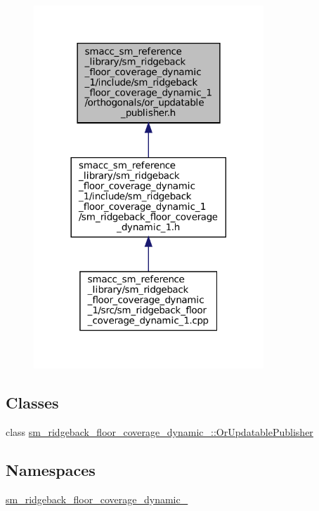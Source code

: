 \begin{figure}[H]
\begin{center}
\leavevmode
\includegraphics[width=245pt]{sm__ridgeback__floor__coverage__dynamic__1_2include_2sm__ridgeback__floor__coverage__dynamic__1_69329d48beb8dd4607f1038bde9d5de8}
\end{center}
\end{figure}
\subsection*{Classes}
\begin{DoxyCompactItemize}
\item 
class \hyperlink{classsm__ridgeback__floor__coverage__dynamic__1_1_1OrUpdatablePublisher}{sm\+\_\+ridgeback\+\_\+floor\+\_\+coverage\+\_\+dynamic\+\_\+::\+Or\+Updatable\+Publisher}
\end{DoxyCompactItemize}
\subsection*{Namespaces}
\begin{DoxyCompactItemize}
\item 
 \hyperlink{namespacesm__ridgeback__floor__coverage__dynamic__1}{sm\+\_\+ridgeback\+\_\+floor\+\_\+coverage\+\_\+dynamic\+\_}
\end{DoxyCompactItemize}

